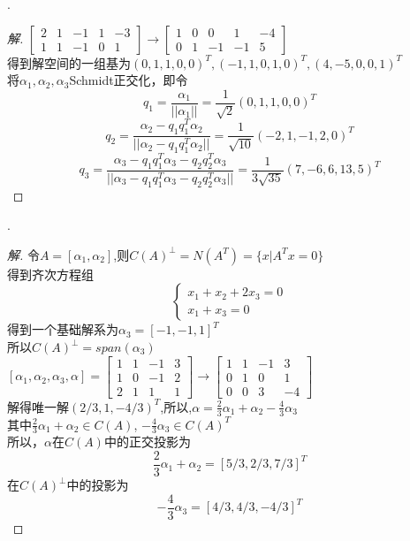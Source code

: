 \documentclass[10pt,a4paper]{report}
\begin{document}
.
\begin{proof}[解]
	$\left[
	\begin{matrix}
	2 & 1 & -1 & 1 & -3\\
	1 & 1 & -1 & 0 & 1 
	\end{matrix}
	\right] \rightarrow \left[
	\begin{matrix}
	1 & 0 & 0 & 1 & -4\\
	0 & 1 & -1 & -1 & 5
	\end{matrix}
	\right]$\\
	得到解空间的一组基为$(0,1,1,0,0)^{T},(-1,1,0,1,0)^{T},(4,-5,0,0,1)^{T}$\\
	将$\alpha_{1},\alpha_{2},\alpha_{3}$Schmidt正交化，即令\\
	$$
	q_{1} = \frac{\alpha_{1}}{||\alpha_{1}||} = \frac{1}{\sqrt{2}}(0,1,1,0,0)^{T}
	$$
	$$
	q_{2} = \frac{\alpha_{2}-q_{1}q_{1}^{T}\alpha_{2}}{||\alpha_{2}-q_{1}q_{1}^{T}\alpha_{2}||} = \frac{1}{\sqrt{10}}(-2,1,-1,2,0)^{T}
	$$
	$$
	q_{3} = \frac{\alpha_{3}-q_{1}q_{1}^{T}\alpha_{3}-q_{2}q_{2}^{T}\alpha_{3}}{||\alpha_{3}-q_{1}q_{1}^{T}\alpha_{3}-q_{2}q_{2}^{T}\alpha_{3}||} = \frac{1}{3\sqrt{35}}(7,-6,6,13,5)^{T}
	$$
\end{proof}
.
\begin{proof}[解]
	令$A=[\alpha_{1},\alpha_{2}]$,则$C(A)^{\perp} = N(A^{T}) = \{x|A^{T}x=0\}$\\
	得到齐次方程组\\
	$$
	\left\{
	\begin{aligned}
	x_{1}+x_{2}+2x_{3}=0\\
	x_{1}+x_{3}=0
	\end{aligned}
	\right.
	$$
	得到一个基础解系为$\alpha_{3} = [-1,-1,1]^{T}$\\
	所以$C(A)^{\perp} = span(\alpha_{3})$\\
	$[\alpha_{1},\alpha_{2},\alpha_{3},\alpha] = \left[
	\begin{matrix}
	1 & 1 & -1 & 3\\
	1 & 0 & -1 & 2 \\
	2 & 1 & 1 & 1
	\end{matrix}
	\right] \rightarrow \left[
	\begin{matrix}
	1 & 1 & -1 & 3\\
	0 & 1 & 0 & 1 \\
	0 & 0 & 3 & -4
	\end{matrix}
	\right]$\\
	解得唯一解$(2/3,1,-4/3)^{T}$,所以,$\alpha = \frac{2}{3}\alpha_{1}+\alpha_{2}-\frac{4}{3}\alpha_{3}$\\
	其中$\frac{2}{3}\alpha_{1}+\alpha_{2} \in C(A)$, $-\frac{4}{3}\alpha_{3} \in C(A)^{T}$\\
	所以，$\alpha$在$C(A)$中的正交投影为
	$$\frac{2}{3}\alpha_{1}+\alpha_{2} = [5/3,2/3,7/3]^{T}$$
	在$C(A)^{\perp}$中的投影为
	$$-\frac{4}{3}\alpha_{3} = [4/3,4/3,-4/3]^{T}$$
\end{proof}
\end{document}
